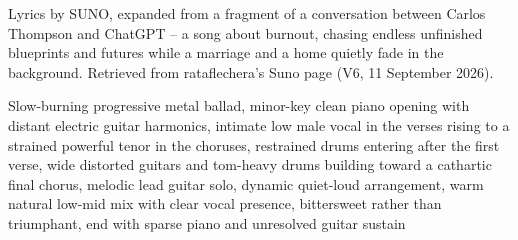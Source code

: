 
\begin{notes}
Lyrics by SUNO, expanded from a fragment of a conversation between Carlos Thompson and ChatGPT -- a song about burnout, chasing endless unfinished blueprints and futures while a marriage and a home quietly fade in the background. Retrieved from rataflechera's Suno page (V6, 11 September 2026).
\end{notes}
\begin{style}
Slow-burning progressive metal ballad, minor-key clean piano opening with distant electric guitar harmonics, intimate low male vocal in the verses rising to a strained powerful tenor in the choruses, restrained drums entering after the first verse, wide distorted guitars and tom-heavy drums building toward a cathartic final chorus, melodic lead guitar solo, dynamic quiet-loud arrangement, warm natural low-mid mix with clear vocal presence, bittersweet rather than triumphant, end with sparse piano and unresolved guitar sustain
\end{style}
